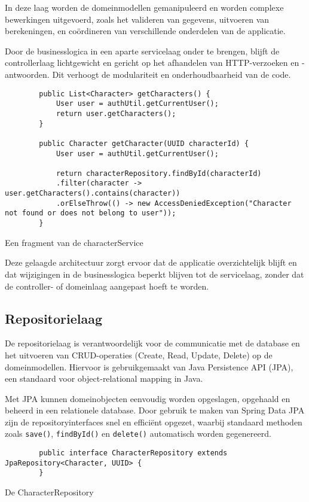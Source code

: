 In deze laag worden de domeinmodellen gemanipuleerd en worden complexe bewerkingen uitgevoerd, zoals het valideren van gegevens, uitvoeren van berekeningen, en coördineren van verschillende onderdelen van de applicatie.

Door de businesslogica in een aparte servicelaag onder te brengen, blijft de controllerlaag lichtgewicht en gericht op het afhandelen van HTTP-verzoeken en -antwoorden. Dit verhoogt de modulariteit en onderhoudbaarheid van de code.

\begin{listing}
    \begin{verbatim}
        public List<Character> getCharacters() {
            User user = authUtil.getCurrentUser();
            return user.getCharacters();
        }
        
        public Character getCharacter(UUID characterId) {
            User user = authUtil.getCurrentUser();
            
            return characterRepository.findById(characterId)
            .filter(character -> user.getCharacters().contains(character))
            .orElseThrow(() -> new AccessDeniedException("Character not found or does not belong to user"));
        }
    \end{verbatim}
    \caption[serviceExample]{Een fragment van de  characterService}
\end{listing}

Deze gelaagde architectuur zorgt ervoor dat de applicatie overzichtelijk blijft en dat wijzigingen in de businesslogica beperkt blijven tot de servicelaag, zonder dat de controller- of domeinlaag aangepast hoeft te worden.

\subsection{Repositorielaag}

De repositorielaag is verantwoordelijk voor de communicatie met de database en het uitvoeren van CRUD-operaties (Create, Read, Update, Delete) op de domeinmodellen. Hiervoor is gebruikgemaakt van Java Persistence API (JPA), een standaard voor object-relational mapping in Java.

Met JPA kunnen domeinobjecten eenvoudig worden opgeslagen, opgehaald en beheerd in een relationele database. Door gebruik te maken van Spring Data JPA zijn de repositoryinterfaces snel en efficiënt opgezet, waarbij standaard methoden zoals \texttt{save()}, \texttt{findById()} en \texttt{delete()} automatisch worden gegenereerd.
\begin{listing}
    \begin{verbatim}
        public interface CharacterRepository extends JpaRepository<Character, UUID> {
        }
    \end{verbatim}
    \caption[RepositoryExample]{De CharacterRepository}
\end{listing}


